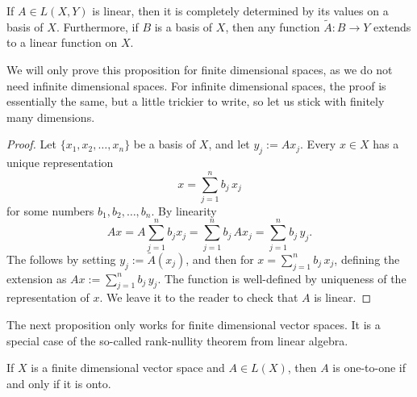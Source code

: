 \begin{prop} \label{mv:lindefonbasis}
If $A \in L(X,Y)$ is linear, then it is completely determined
by its values on a basis of $X$.
Furthermore, if $B$ is a basis of $X$,
then any function $\widetilde{A} \colon B \to Y$ extends to a linear
function on $X$.
\end{prop}

We will only prove this proposition for finite dimensional spaces, as we do
not need infinite dimensional spaces.
For infinite dimensional spaces, the proof is essentially the same, but a
little trickier to write, so let us stick with finitely many dimensions.

\begin{proof}
Let $\{ x_1, x_2, \ldots, x_n \}$ be a basis of $X$, and let 
$y_j := A x_j$.  Every $x \in X$ has a unique representation
\begin{equation*}
x = \sum_{j=1}^n b_j \, x_j
\end{equation*}
for some numbers $b_1,b_2,\ldots,b_n$.  By linearity
\begin{equation*}
Ax = 
A\sum_{j=1}^n b_j x_j
=
\sum_{j=1}^n b_j \, Ax_j
=
\sum_{j=1}^n b_j \, y_j .
\end{equation*}
The  follows by setting $y_j := \widetilde{A}(x_j)$,
and then for 
$x = \sum_{j=1}^n b_j \, x_j$,
defining the extension as
$Ax := \sum_{j=1}^n b_j \, y_j$.  The function is well-defined by
uniqueness of the representation of $x$.
We leave it to the reader to check that $A$ is linear.
\end{proof}

The next proposition only works for finite dimensional vector spaces.
It is a special case of the so-called rank-nullity theorem from linear
algebra.

\begin{prop} \label{mv:prop:lin11onto}
If $X$ is a finite dimensional vector space and $A \in L(X)$, then $A$ is one-to-one if and only if it is onto.
\end{prop}

